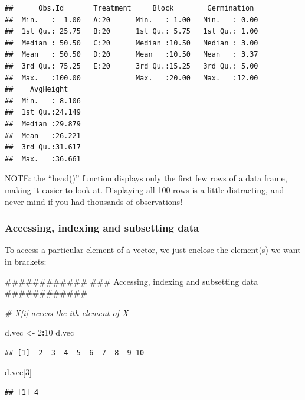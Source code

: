\documentclass[]{article}
\newenvironment{Shaded}{\begin{snugshade}}{\end{snugshade}}
\newcommand{\DecValTok}[1]{\textcolor[rgb]{0.00,0.00,0.81}{#1}}
\newcommand{\StringTok}[1]{\textcolor[rgb]{0.31,0.60,0.02}{#1}}
\newcommand{\CommentTok}[1]{\textcolor[rgb]{0.56,0.35,0.01}{\textit{#1}}}
\newcommand{\OperatorTok}[1]{\textcolor[rgb]{0.81,0.36,0.00}{\textbf{#1}}}
\newcommand{\NormalTok}[1]{#1}
\begin{document}
\begin{verbatim}
##      Obs.Id       Treatment     Block        Germination   
##  Min.   :  1.00   A:20      Min.   : 1.00   Min.   : 0.00  
##  1st Qu.: 25.75   B:20      1st Qu.: 5.75   1st Qu.: 1.00  
##  Median : 50.50   C:20      Median :10.50   Median : 3.00  
##  Mean   : 50.50   D:20      Mean   :10.50   Mean   : 3.37  
##  3rd Qu.: 75.25   E:20      3rd Qu.:15.25   3rd Qu.: 5.00  
##  Max.   :100.00             Max.   :20.00   Max.   :12.00  
##    AvgHeight     
##  Min.   : 8.106  
##  1st Qu.:24.149  
##  Median :29.879  
##  Mean   :26.221  
##  3rd Qu.:31.617  
##  Max.   :36.661
\end{verbatim}

NOTE: the ``head()'' function displays only the first few rows of a data
frame, making it easier to look at. Displaying all 100 rows is a little
distracting, and never mind if you had thousands of observations!

\subsubsection{Accessing, indexing and subsetting
data}\label{accessing-indexing-and-subsetting-data}

To access a particular element of a vector, we just enclose the
element(s) we want in brackets:

\begin{Shaded}
\begin{Highlighting}[]
\NormalTok{############}
\NormalTok{### Accessing, indexing and subsetting data}
\NormalTok{############}

\CommentTok{# X[i]         access the ith element of X}

\NormalTok{d.vec <-}\StringTok{ }\DecValTok{2}\OperatorTok{:}\DecValTok{10}
\NormalTok{d.vec}
\end{Highlighting}
\end{Shaded}

\begin{verbatim}
## [1]  2  3  4  5  6  7  8  9 10
\end{verbatim}

\begin{Shaded}
\begin{Highlighting}[]
\NormalTok{d.vec[}\DecValTok{3}\NormalTok{]}
\end{Highlighting}
\end{Shaded}

\begin{verbatim}
## [1] 4
\end{verbatim}
\end{document}
